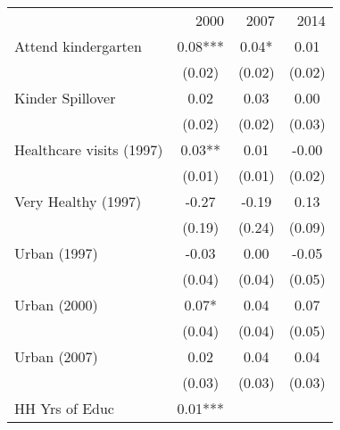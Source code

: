 \begin{tabular}{llll}
\cline{1-4}
\multicolumn{1}{c}{} &
  \multicolumn{1}{|r}{2000} &
  \multicolumn{1}{r}{2007} &
  \multicolumn{1}{r}{2014} \\
\cline{1-4}
\multicolumn{1}{l}{Attend kindergarten} &
  \multicolumn{1}{|c}{0.08***} &
  \multicolumn{1}{c}{0.04* } &
  \multicolumn{1}{c}{0.01 } \\
\multicolumn{1}{l}{} &
  \multicolumn{1}{|c}{(0.02)} &
  \multicolumn{1}{c}{(0.02)} &
  \multicolumn{1}{c}{(0.02)} \\
\multicolumn{1}{l}{Kinder Spillover} &
  \multicolumn{1}{|c}{0.02 } &
  \multicolumn{1}{c}{0.03 } &
  \multicolumn{1}{c}{0.00 } \\
\multicolumn{1}{l}{} &
  \multicolumn{1}{|c}{(0.02)} &
  \multicolumn{1}{c}{(0.02)} &
  \multicolumn{1}{c}{(0.03)} \\
\multicolumn{1}{l}{Healthcare visits (1997)} &
  \multicolumn{1}{|c}{0.03** } &
  \multicolumn{1}{c}{0.01 } &
  \multicolumn{1}{c}{-0.00 } \\
\multicolumn{1}{l}{} &
  \multicolumn{1}{|c}{(0.01)} &
  \multicolumn{1}{c}{(0.01)} &
  \multicolumn{1}{c}{(0.02)} \\
\multicolumn{1}{l}{Very Healthy (1997)} &
  \multicolumn{1}{|c}{-0.27 } &
  \multicolumn{1}{c}{-0.19 } &
  \multicolumn{1}{c}{0.13 } \\
\multicolumn{1}{l}{} &
  \multicolumn{1}{|c}{(0.19)} &
  \multicolumn{1}{c}{(0.24)} &
  \multicolumn{1}{c}{(0.09)} \\
\multicolumn{1}{l}{Urban (1997)} &
  \multicolumn{1}{|c}{-0.03 } &
  \multicolumn{1}{c}{0.00 } &
  \multicolumn{1}{c}{-0.05 } \\
\multicolumn{1}{l}{} &
  \multicolumn{1}{|c}{(0.04)} &
  \multicolumn{1}{c}{(0.04)} &
  \multicolumn{1}{c}{(0.05)} \\
\multicolumn{1}{l}{Urban (2000)} &
  \multicolumn{1}{|c}{0.07* } &
  \multicolumn{1}{c}{0.04 } &
  \multicolumn{1}{c}{0.07 } \\
\multicolumn{1}{l}{} &
  \multicolumn{1}{|c}{(0.04)} &
  \multicolumn{1}{c}{(0.04)} &
  \multicolumn{1}{c}{(0.05)} \\
\multicolumn{1}{l}{Urban (2007)} &
  \multicolumn{1}{|c}{0.02 } &
  \multicolumn{1}{c}{0.04 } &
  \multicolumn{1}{c}{0.04 } \\
\multicolumn{1}{l}{} &
  \multicolumn{1}{|c}{(0.03)} &
  \multicolumn{1}{c}{(0.03)} &
  \multicolumn{1}{c}{(0.03)} \\
\multicolumn{1}{l}{HH Yrs of Educ} &
  \multicolumn{1}{|c}{0.01***} &

\end{tabular}
